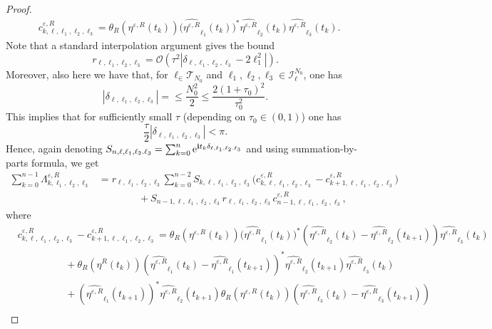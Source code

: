 \documentclass[a4paper]{amsart}
\begin{document}
\begin{proof}
\begin{align*}
& c^{\varepsilon,R}_{k,\ell,\ell_1,\ell_2,\ell_3}
=\theta_R(\eta^{\varepsilon,R}(t_k))\big(\widehat{\eta^{\varepsilon,R}}_{\ell_1}(t_k)\big)^*\widehat{\eta^{\varepsilon,R}}_{\ell_2}(t_k) \widehat{\eta^{\varepsilon,R}}_{\ell_3}(t_k).
\end{align*}
Note that a standard interpolation argument gives the bound
$$
r_{\ell,\ell_1,\ell_2,\ell_3}=\mathcal{O}(\tau^2 |\delta_{\ell,\ell_1,\ell_2,\ell_3}-2\ell_1^2|).
$$
Moreover, also here we have that, for $\ell_\in \mathcal{T}_{N_0}$ and $\ell_1,\ell_2, \ell_3 \in \mathcal{I}_{\ell}^{N_0}$, one has
$$
|\delta_{\ell,\ell_1,\ell_2,\ell_3}|=\le  \frac{N_0^2}{2}\le \frac{2(1+\tau_0)^2}{\tau_0^2}.
$$
This implies that for sufficiently small $\tau$ (depending on $\tau_0 \in (0,1)$) one has 
$$
\frac{\tau}{2}|\delta_{\ell,\ell_1,\ell_2,\ell_3}|<\pi.
$$
Hence, again denoting $S_{n,\ell,\ell_1,\ell_2.\ell_3}=\sum_{k=0}^n {\rm e}^{{\bf i}t_k\delta_{\ell,\ell_1,\ell_2.\ell_3}}$ and using summation-by-parts formula, we get
\begin{align*}
\sum_{k=0}^{n-1}\Lambda^{\varepsilon,R}_{k,\ell_1,\ell_2,\ell_3}&=r_{\ell,\ell_1,\ell_2,\ell_3}\sum_{k=0}^{n-2}S_{k,\ell,\ell_1,\ell_2,\ell_3}\big(c^{\varepsilon,R}_{k,\ell,\ell_1,\ell_2,\ell_3}-c^{\varepsilon,R}_{k+1,\ell,\ell_1,\ell_2,\ell_3}\big)\\
&\qquad\qquad +S_{n-1,\ell,\ell_1,\ell_2,\ell_3}r_{\ell,\ell_1,\ell_2,\ell_3}c^{\varepsilon,R}_{n-1,\ell,\ell_1,\ell_2,\ell_3},
\end{align*}
where
\begin{align*}
    &c^{\varepsilon,R}_{k,\ell,\ell_1,\ell_2,\ell_3}-c^{\varepsilon,R}_{k+1,\ell,\ell_1,\ell_2,\ell_3} = \theta_R(\eta^{\varepsilon,R}(t_k)) \big(\widehat{\eta^{\varepsilon,R}}_{\ell_1}(t_k)\big)^*(\widehat{\eta^{\varepsilon,R}}_{\ell_2}(t_k)-\widehat{\eta^{\varepsilon,R}}_{\ell_2}(t_{k+1}))\widehat{\eta^{\varepsilon,R}}_{\ell_3}(t_k)\\
   & \hspace{2cm}+ \theta_R(\eta^R(t_k)) (\widehat{\eta^{\varepsilon,R}}_{\ell_1}(t_k)-\widehat{\eta^{\varepsilon,R}}_{\ell_1}(t_{k+1}))^*\widehat{\eta^{\varepsilon,R}}_{\ell_2}(t_{k+1})\widehat{\eta^{\varepsilon,R}}_{\ell_3}(t_k)\\
   &\hspace{2cm}+(\widehat{\eta^{\varepsilon,R}}_{\ell_1}(t_{k+1}))^*\widehat{\eta^{\varepsilon,R}}_{\ell_2}(t_{k+1})\theta_R(\eta^{\varepsilon,R}(t_k))(\widehat{\eta^{\varepsilon,R}}_{\ell_3}(t_k)-\widehat{\eta^{\varepsilon,R}}_{\ell_3}(t_{k+1}))\\

\end{align*}
\end{proof}
\end{document}
